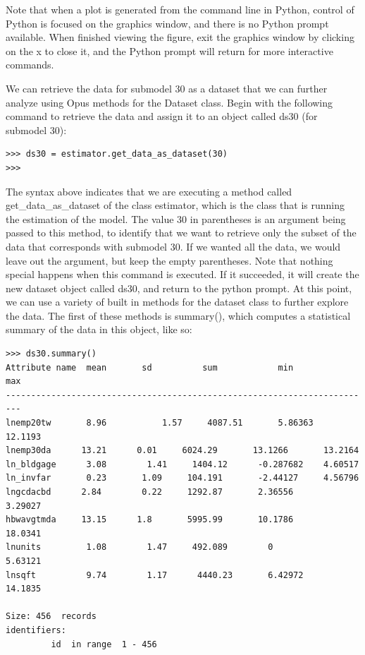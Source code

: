 Note that when a plot is generated from the command line in Python, control of Python is focused on the graphics window, and there is no Python prompt available.  When finished viewing the figure, exit the graphics window by clicking on the x to close it, and the Python prompt will return for more interactive commands.

We can retrieve the data for submodel 30 as a dataset that we can further analyze using Opus methods for the Dataset class.  Begin with the following command to retrieve the data and assign it to an object called ds30 (for submodel 30):

\begin{lstlisting}
>>> ds30 = estimator.get_data_as_dataset(30)
>>>
\end{lstlisting}

The syntax above indicates that we are executing a method called get\_data\_as\_dataset of the class estimator, which is the class that is running the estimation of the model.  The value 30 in parentheses is an argument being passed to this method, to identify that we want to retrieve only the subset of the data that corresponds with submodel 30.  If we wanted all the data, we would leave out the argument, but keep the empty parentheses.  Note that nothing special happens when this command is executed.  If it succeeded, it will create the new dataset object called ds30, and return to the python prompt.  At this point, we can use a variety of built in methods for the dataset class to further explore the data.  The first of these methods is summary(), which computes a statistical summary of the data in this object, like so:\\

\begin{lstlisting}
>>> ds30.summary()
Attribute name	mean       sd	       sum            min             max
-------------------------------------------------------------------------
lnemp20tw       8.96	       1.57     4087.51       5.86363       12.1193
lnemp30da      13.21      0.01     6024.29       13.1266       13.2164
ln_bldgage      3.08        1.41     1404.12      -0.287682    4.60517
ln_invfar       0.23       1.09     104.191       -2.44127     4.56796
lngcdacbd      2.84        0.22     1292.87       2.36556       3.29027
hbwavgtmda     13.15      1.8       5995.99       10.1786       18.0341
lnunits         1.08        1.47     492.089        0            5.63121
lnsqft          9.74        1.17      4440.23       6.42972      14.1835

Size: 456  records
identifiers: 
         id  in range  1 - 456
\end{lstlisting}


